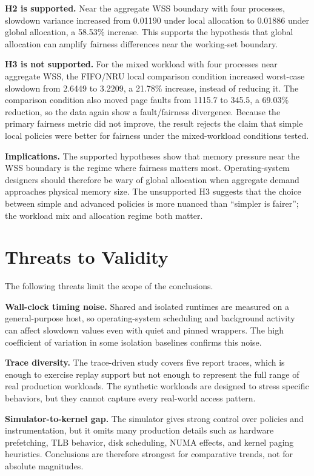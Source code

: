 \documentclass[conference]{IEEEtran}
\begin{document}
\textbf{H2 is supported.} Near the aggregate WSS boundary with four processes, slowdown variance increased from 0.01190 under local allocation to 0.01886 under global allocation, a 58.53\% increase. This supports the hypothesis that global allocation can amplify fairness differences near the working-set boundary.

\textbf{H3 is not supported.} For the mixed workload with four processes near aggregate WSS, the FIFO/NRU local comparison condition increased worst-case slowdown from 2.6449 to 3.2209, a 21.78\% increase, instead of reducing it. The comparison condition also moved page faults from 1115.7 to 345.5, a 69.03\% reduction, so the data again show a fault/fairness divergence. Because the primary fairness metric did not improve, the result rejects the claim that simple local policies were better for fairness under the mixed-workload conditions tested.

\textbf{Implications.} The supported hypotheses show that memory pressure near the WSS boundary is the regime where fairness matters most. Operating-system designers should therefore be wary of global allocation when aggregate demand approaches physical memory size. The unsupported H3 suggests that the choice between simple and advanced policies is more nuanced than ``simpler is fairer''; the workload mix and allocation regime both matter.

\section{Threats to Validity}
The following threats limit the scope of the conclusions.

\textbf{Wall-clock timing noise.} Shared and isolated runtimes are measured on a general-purpose host, so operating-system scheduling and background activity can affect slowdown values even with quiet and pinned wrappers. The high coefficient of variation in some isolation baselines confirms this noise.

\textbf{Trace diversity.} The trace-driven study covers five report traces, which is enough to exercise replay support but not enough to represent the full range of real production workloads. The synthetic workloads are designed to stress specific behaviors, but they cannot capture every real-world access pattern.

\textbf{Simulator-to-kernel gap.} The simulator gives strong control over policies and instrumentation, but it omits many production details such as hardware prefetching, TLB behavior, disk scheduling, NUMA effects, and kernel paging heuristics. Conclusions are therefore strongest for comparative trends, not for absolute magnitudes.
\end{document}
